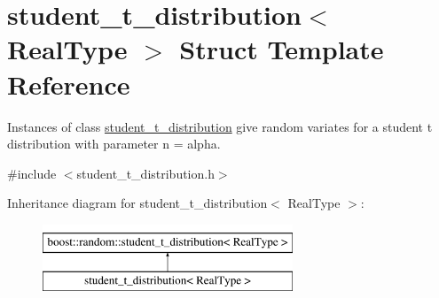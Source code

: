 \hypertarget{structstudent__t__distribution}{}\section{student\+\_\+t\+\_\+distribution$<$ Real\+Type $>$ Struct Template Reference}
\label{structstudent__t__distribution}


Instances of class \mbox{\hyperlink{structstudent__t__distribution}{student\+\_\+t\+\_\+distribution}} give random variates for a student t distribution with parameter n = alpha.  




{\ttfamily \#include $<$student\+\_\+t\+\_\+distribution.\+h$>$}

Inheritance diagram for student\+\_\+t\+\_\+distribution$<$ Real\+Type $>$\+:\begin{figure}[H]
\begin{center}
\leavevmode
\includegraphics[height=2.000000cm]{structstudent__t__distribution}
\end{center}
\end{figure}
